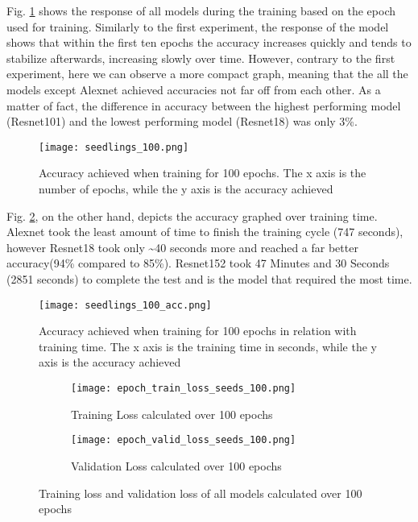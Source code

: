 Fig. \ref{fig:seedlings_100_epoch_accuracy} shows the response of all models during the training based on the epoch used for training. Similarly to the first experiment, the response of the model shows that within the first ten epochs the accuracy increases quickly and tends to stabilize afterwards, increasing slowly over time. However, contrary to the first experiment, here we can observe a more compact graph, meaning that the all the models except Alexnet achieved accuracies not far off from each other.
As a matter of fact, the difference in accuracy between the highest performing model (Resnet101) and the lowest performing model (Resnet18) was only 3\%.  
\begin{figure}[h]
       \centering 
	    \texttt{[image: seedlings\_100.png]}
        \caption[Accuracy achieved when training for 100 epochs]{Accuracy achieved when training for 100 epochs. The x axis is the number of epochs, while the y axis is the accuracy achieved}
         \label{fig:seedlings_100_epoch_accuracy}
\end{figure}

Fig. \ref{fig:seedlings_100_acc}, on the other hand, depicts the accuracy graphed over training time. Alexnet took the least amount of time to finish the training cycle (747 seconds), however Resnet18 took only \textasciitilde40 seconds more and reached a far better accuracy(94\% compared to 85\%). Resnet152 took 47 Minutes and 30 Seconds (2851 seconds) to complete the test and is the model that required the most time. \\
\begin{figure}[h]
       \centering 
	    \texttt{[image: seedlings\_100\_acc.png]}
        \caption[Accuracy achieved when training for 100 epochs in relation with training time]{Accuracy achieved when training for 100 epochs in relation with training time. The x axis is the training time in seconds, while the y axis is the accuracy achieved}
         \label{fig:seedlings_100_acc}
\end{figure}

\begin{figure}[h]
\begin{subfigure}{0.5\textwidth}
	    \texttt{[image: epoch\_train\_loss\_seeds\_100.png]}
	    \caption{Training Loss calculated over 100 epochs}
        \label{fig:train_loss_seeds_100}
     \end{subfigure} \hfill
     \begin{subfigure}{0.5\textwidth}
	    \texttt{[image: epoch\_valid\_loss\_seeds\_100.png]}
	    \caption{Validation Loss calculated over 100 epochs}
         \label{fig:valid_loss_seeds_100}
     \end{subfigure}
     
     \caption{Training loss and validation loss of all models calculated over 100 epochs}
        \label{fig:tran_valid_loss_seeds_100}
        
      
\end{figure}

